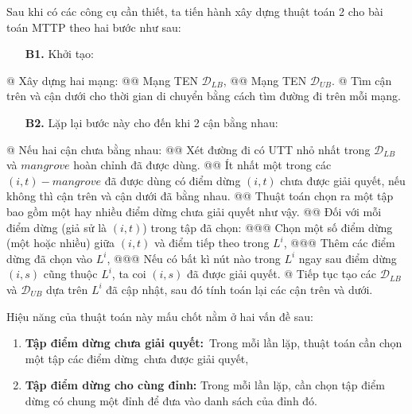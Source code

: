 \documentclass[../main.tex]{subfiles}
\begin{document}
Sau khi có các công cụ cần thiết, ta tiến hành xây dựng thuật toán 2 cho
bài toán MTTP theo hai bước như sau:



\begin{itemize}
  \item[\textbf{B1.}] Khởi tạo: 
\end{itemize}  
\begin{easylist}[itemize]
    @ Xây dựng hai mạng: 
        @@ Mạng TEN \(\mathcal D_{LB}\), 
        @@ Mạng TEN \(\mathcal D_{UB}\). 
    @ Tìm cận trên và cận dưới cho thời gian di chuyển bằng cách tìm đường đi trên mỗi mạng.
\end{easylist}

\begin{itemize}  
\item[\textbf{B2.}] Lặp lại bước này cho đến khi 2 cận bằng nhau: 
\end{itemize}
\begin{easylist}[itemize]
    @ Nếu hai cận chưa bằng nhau: 
        @@ Xét đường đi có UTT nhỏ nhất trong \(\mathcal D_{LB}\) và \(mangrove\) hoàn chỉnh đã được dùng. 
        @@ Ít nhất một trong các \((i,t)-mangrove\) đã được dùng có điểm dừng \((i,t)\) chưa được giải quyết, nếu không thì cận trên và cận dưới đã bằng nhau. 
        @@ Thuật toán chọn ra một tập bao gồm một hay nhiều điểm dừng chưa giải quyết như vậy.
        @@ Đối với mỗi điểm dừng (giả sử là \((i,t)\)) trong tập đã chọn: 
            @@@ Chọn một số điểm dừng (một hoặc nhiều) giữa \((i,t)\) và điểm tiếp theo trong \(L^i\), 
            @@@ Thêm các điểm dừng đã chọn vào \(L^i\), 
            @@@ Nếu có bất kì nút nào trong \(L^i\) ngay sau điểm dừng \((i,s)\) cũng thuộc \(L^i\), ta coi \((i,s)\) đã được giải quyết. 
    @ Tiếp tục tạo các \(\mathcal D_{LB}\) và \(\mathcal D_{UB}\) dựa trên \(L^i\) đã cập nhật, sau đó tính toán lại các cận trên và dưới.
\end{easylist}

Hiệu năng của thuật toán này mấu chốt nằm ở hai vấn đề sau:

\begin{enumerate}
\def\labelenumi{\arabic{enumi}.}
\tightlist
\item
  \textbf{Tập điểm dừng chưa giải quyết:}~Trong mỗi lần lặp, thuật toán
  cần chọn một tập các điểm dừng~chưa được giải quyết,
\item
  \textbf{Tập điểm dừng cho cùng đỉnh:} Trong mỗi lần lặp, cần chọn tập
  điểm dừng có chung một đỉnh để đưa vào danh sách của đỉnh đó.
\end{enumerate}
\end{document}
